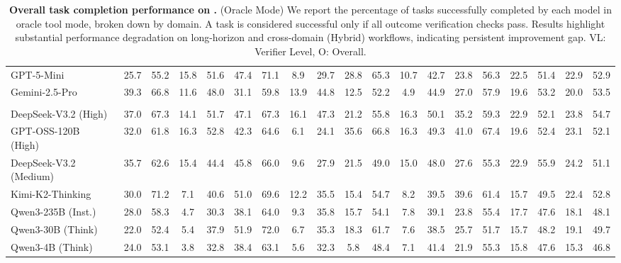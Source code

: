 \begin{table}[h!]
{\begin{tabular}{lcccccccccccccccccc}
GPT-5-Mini \citep{openai2025gpt5} & 25.7 & 55.2 & 15.8 & 51.6 & 47.4 & 71.1 & 8.9 & 29.7 & 28.8 & 65.3 & 10.7 & 42.7 & 23.8 & 56.3 & 22.5 & 51.4 & 22.9 & 52.9\\
Gemini-2.5-Pro \citep{comanici2025gemini25pushingfrontier} & 39.3 & 66.8 & 11.6 & 48.0 & 31.1 & 59.8 & 13.9 & 44.8 & 12.5 & 52.2 & 4.9 & 44.9 & 27.0 & 57.9 & 19.6 & 53.2 & 20.0 & 53.5 \\
\rowcolor{gray!15} \multicolumn{19}{c}{\textit{Open Source Models}} \\
DeepSeek-V3.2 (High)~\citep{deepseekai2024deepseekv3technicalreport} & 37.0 & 67.3 & 14.1 & 51.7 & 47.1 & 67.3 & 16.1 & 47.3 & 21.2 & 55.8 & 16.3 & 50.1 & 35.2 & 59.3 & 22.9 & 52.1 & 23.8 & 54.7 \\
GPT-OSS-120B (High)~\citep{openai2025gptoss120bgptoss20bmodel} & 32.0 & 61.8 & 16.3 & 52.8 & 42.3 & 64.6 & 6.1 & 24.1 & 35.6 & 66.8 & 16.3 & 49.3 & 41.0 & 67.4 & 19.6 & 52.4 & 23.1 & 52.1 \\
DeepSeek-V3.2 (Medium)~\citep{deepseekai2024deepseekv3technicalreport} & 35.7 & 62.6 & 15.4 & 44.4 & 45.8 & 66.0 & 9.6 & 27.9 & 21.5 & 49.0 & 15.0 & 48.0 & 27.6 & 55.3 & 22.9 & 55.9 & 24.2 & 51.1 \\
Kimi-K2-Thinking~\citep{kimiteam2025kimik2openagentic} & 30.0 & 71.2 & 7.1 & 40.6 & 51.0 & 69.6 & 12.2 & 35.5 & 15.4 & 54.7 & 8.2 & 39.5 & 39.6 & 61.4 & 15.7 & 49.5 & 22.4 & 52.8 \\
Qwen3-235B (Inst.)~\citep{qwen3} & 28.0 & 58.3 & 4.7 & 30.3 & 38.1 & 64.0 & 9.3 & 35.8 & 15.7 & 54.1 & 7.8 & 39.1 & 23.8 & 55.4 & 17.7 & 47.6 & 18.1 & 48.1 \\
Qwen3-30B (Think)~\citep{qwen3} & 22.0 & 52.4 & 5.4 & 37.9 & 51.9 & 72.0 & 6.7 & 35.3 & 18.3 & 61.7 & 7.6 & 38.5 & 25.7 & 51.7 & 15.7 & 48.2 & 19.1 & 49.7\\
Qwen3-4B (Think)~\citep{qwen3} & 24.0 & 53.1 & 3.8 & 32.8 & 38.4 & 63.1 & 5.6 & 32.3 & 5.8 & 48.4 & 7.1 & 41.4 & 21.9 & 55.3 & 15.8 & 47.6 & 15.3 & 46.8 \\
\bottomrule
\end{tabular}%
}
\caption{\textbf{Overall task completion performance on \ours{}.} (Oracle Mode) We report the percentage of tasks successfully completed by each model in oracle tool mode, broken down by domain. A task is considered successful only if all outcome verification checks pass. Results highlight substantial performance degradation on long-horizon and cross-domain (Hybrid) workflows, indicating persistent improvement gap. VL: Verifier Level, O: Overall.}
\label{tab:main_results_appendix}
\end{table}